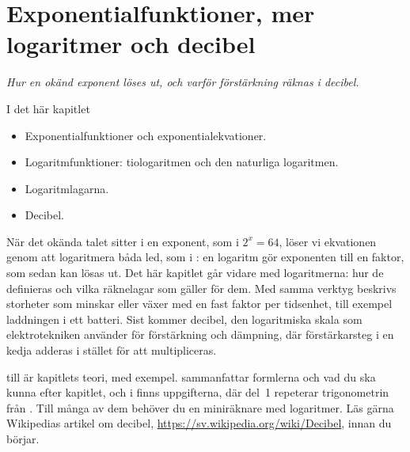 
\chapter{Exponentialfunktioner, mer logaritmer och decibel}
\label{c10:ch}

{\large\itshape Hur en okänd exponent löses ut, och varför förstärkning räknas i decibel.\par}

\begin{chapterbox}{I det här kapitlet}
\begin{itemize}
  \item Exponentialfunktioner och exponentialekvationer.
  \item Logaritmfunktioner: tiologaritmen och den naturliga logaritmen.
  \item Logaritmlagarna.
  \item Decibel.
\end{itemize}
\end{chapterbox}

När det okända talet sitter i en exponent, som i $2^x = 64$, löser vi ekvationen genom att
logaritmera båda led, som i : en logaritm gör exponenten till en
faktor, som sedan kan lösas ut. Det här kapitlet går vidare med logaritmerna: hur de definieras och
vilka räknelagar som gäller för dem. Med samma verktyg beskrivs storheter som
minskar eller växer med en fast faktor per tidsenhet, till exempel laddningen i ett batteri. Sist
kommer decibel, den logaritmiska skala som elektrotekniken använder för förstärkning och dämpning,
där förstärkarsteg i en kedja adderas i stället för att multipliceras.

 till  är kapitlets teori, med exempel.
 sammanfattar formlerna och vad du ska kunna efter kapitlet, och i
 finns uppgifterna, där del~1 repeterar trigonometrin från .
Till många av dem behöver du en miniräknare med logaritmer. Läs gärna Wikipedias artikel om
decibel, \url{https://sv.wikipedia.org/wiki/Decibel}, innan du börjar.





